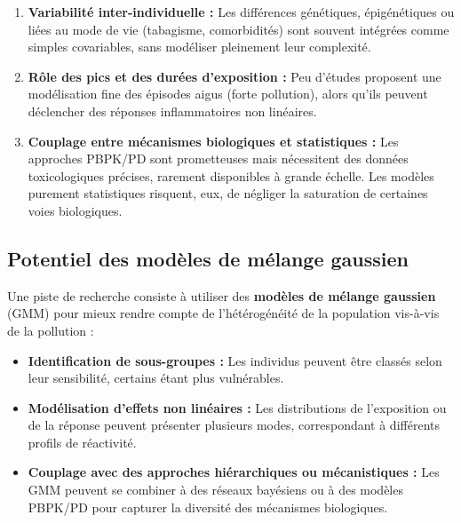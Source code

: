 \begin{enumerate}
    \item \textbf{Variabilité inter-individuelle :} Les différences génétiques, épigénétiques ou liées au mode de vie (tabagisme, comorbidités) sont souvent intégrées comme simples covariables, sans modéliser pleinement leur complexité.
    \item \textbf{Rôle des pics et des durées d’exposition :} Peu d’études proposent une modélisation fine des épisodes aigus (forte pollution), alors qu’ils peuvent déclencher des réponses inflammatoires non linéaires.
    \item \textbf{Couplage entre mécanismes biologiques et statistiques :} Les approches PBPK/PD sont prometteuses mais nécessitent des données toxicologiques précises, rarement disponibles à grande échelle. Les modèles purement statistiques risquent, eux, de négliger la saturation de certaines voies biologiques.
\end{enumerate}

\subsection{Potentiel des modèles de mélange gaussien}
Une piste de recherche consiste à utiliser des \textbf{modèles de mélange gaussien} (GMM) pour mieux rendre compte de l'hétérogénéité de la population vis-à-vis de la pollution :
\begin{itemize}
    \item \textbf{Identification de sous-groupes :} Les individus peuvent être classés selon leur sensibilité, certains étant plus vulnérables.
    \item \textbf{Modélisation d'effets non linéaires :} Les distributions de l'exposition ou de la réponse peuvent présenter plusieurs modes, correspondant à différents profils de réactivité.
    \item \textbf{Couplage avec des approches hiérarchiques ou mécanistiques :} Les GMM peuvent se combiner à des réseaux bayésiens ou à des modèles PBPK/PD pour capturer la diversité des mécanismes biologiques.
\end{itemize}

